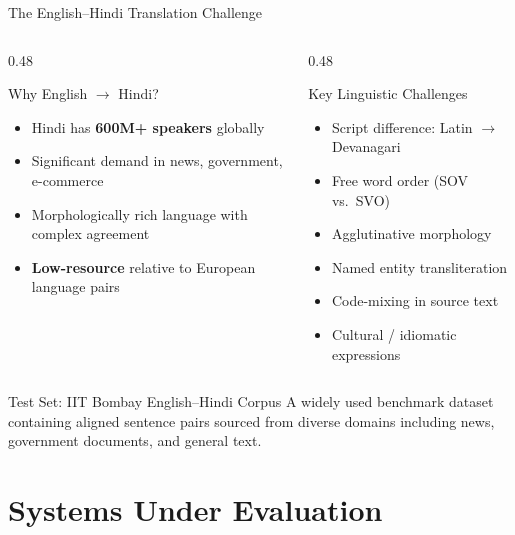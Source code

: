 \documentclass{beamer}
\begin{document}
\begin{frame}{The English–Hindi Translation Challenge}
  \begin{columns}[T]
    \begin{column}{0.48\textwidth}
      \begin{block}{Why English $\rightarrow$ Hindi?}
        \begin{itemize}
          \item Hindi has \textbf{600M+ speakers} globally
          \item Significant demand in news, government, e-commerce
          \item Morphologically rich language with complex agreement
          \item \textbf{Low-resource} relative to European language pairs
        \end{itemize}
      \end{block}
    \end{column}
    \begin{column}{0.48\textwidth}
      \begin{alertblock}{Key Linguistic Challenges}
        \begin{itemize}
          \item Script difference: Latin $\rightarrow$ Devanagari
          \item Free word order (SOV vs.\ SVO)
          \item Agglutinative morphology
          \item Named entity transliteration
          \item Code-mixing in source text
          \item Cultural / idiomatic expressions
        \end{itemize}
      \end{alertblock}
    \end{column}
  \end{columns}
  \vspace{0.3cm}
  \begin{block}{Test Set: IIT Bombay English–Hindi Corpus}
    A widely used benchmark dataset containing aligned sentence pairs sourced from diverse domains including news, government documents, and general text.
  \end{block}
\end{frame}


\section{Systems Under Evaluation}
\end{document}
